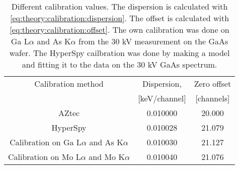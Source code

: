 \begin{table}[hb]
    \centering
    \caption{
        Different calibration values.
        The dispersion is calculated with \cref{eq:theory:calibration:dispersion}.
        The offset is calculated with \cref{eq:theory:calibration:offset}.
        The own calibration was done on Ga L$\alpha$ and As K$\alpha$ from the 30 kV measurement on the GaAs wafer.
        The HyperSpy cailbration was done by making a model and fitting it to the data on the 30 kV GaAs spectrum.
    }
    \label{tab:results:calibrations}
    \begin{tabular}{ccc}
        Calibration method                           & Dispersion,   & Zero offset \\
                                                     & [keV/channel] & [channels]  \\
        \hline
        AZtec                                        & 0.010000      & 20.000      \\
        HyperSpy                                     & 0.010028      & 21.079      \\
        Calibration on Ga L$\alpha$ and As K$\alpha$ & 0.010030      & 21.127      \\
        Calibration on Mo L$\alpha$ and Mo K$\alpha$ & 0.010040      & 21.076
    \end{tabular}
\end{table}
